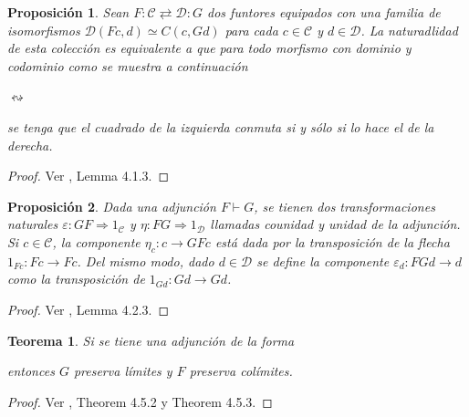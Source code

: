 \documentclass[11pt]{report}
\theoremstyle{colored}
\newtheorem{theorem}{Teorema}[section]
\newtheorem{proposition}{Proposición}[section]
\newcommand{\eps}{\varepsilon}
\newcommand{\cat}[1]{\mathsf{#1}}
\begin{document}
\begin{proposition} \label{lema-adj-cuadrados} Sean $F : \mathscr{C}  \rightleftarrows \mathscr{D} : G$ dos funtores equipados con una familia de isomorfismos $\mathscr{D}(Fc,d) \simeq C(c,Gd)$ para cada $c \in \mathscr{C}$ y $d \in \mathscr{D}$. La naturadlidad de esta colección es equivalente a que para todo morfismo con dominio y codominio como se muestra a continuación
\begin{center}
\quad$\leftrightsquigarrow$\quad
{}
\end{center}
se tenga que el cuadrado de la izquierda conmuta si y sólo si lo hace el de la derecha.
\end{proposition}
\begin{proof} Ver \cite{ct-context}, Lemma 4.1.3.
\end{proof}

\begin{proposition} Dada una adjunción $F \vdash G$, se tienen dos transformaciones naturales $\eps: GF \Rightarrow 1_{\mathscr{C}}$ y $\eta : FG \Rightarrow 1_{\mathscr{D}}$ llamadas counidad y unidad de la adjunción. Si $c \in \mathscr{C}$, la componente $\eta_c : c \to GFc$ está dada por la transposición de la flecha $1_{Fc} : Fc \to Fc$. Del mismo modo, dado $d \in \mathscr{D}$ se define la componente $\eps_d : FGd \to d$ como la transposición de $1_{Gd} : Gd \to Gd$.
\end{proposition}
\begin{proof} Ver \cite{ct-context}, Lemma 4.2.3.
\end{proof}

\begin{theorem} \label{rapl-lapc} Si se tiene una adjunción de la forma
\begin{center}
\end{center}
entonces $G$ preserva límites y $F$ preserva colímites.
\end{theorem}
\begin{proof} Ver \cite{ct-context}, Theorem 4.5.2 y Theorem 4.5.3.
\end{proof}
\end{document}
